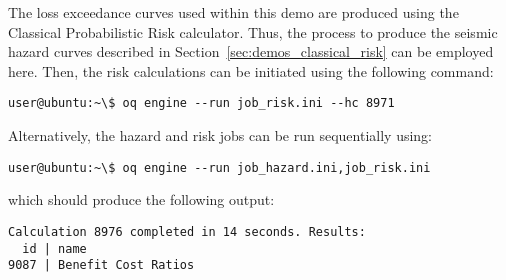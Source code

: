The loss exceedance curves used within this demo are produced using the
Classical Probabilistic Risk calculator. Thus, the process to produce the
seismic hazard curves described in Section~\ref{sec:demos_classical_risk} can
be employed here. Then, the risk calculations can be initiated using the
following command:

\begin{verbatim}
user@ubuntu:~\$ oq engine --run job_risk.ini --hc 8971
\end{verbatim}

Alternatively, the hazard and risk jobs can be run sequentially using:

\begin{verbatim}
user@ubuntu:~\$ oq engine --run job_hazard.ini,job_risk.ini
\end{verbatim}

which should produce the following output:

\begin{verbatim}
Calculation 8976 completed in 14 seconds. Results:
  id | name
9087 | Benefit Cost Ratios
\end{verbatim}
